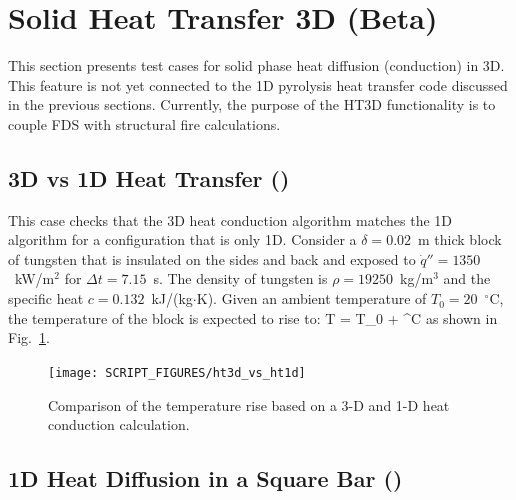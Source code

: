 \documentclass[11pt]{book}
\begin{document}
\newpage

\clearpage

\section{Solid Heat Transfer 3D (Beta)}
\label{sec:ht3d}

This section presents test cases for solid phase heat diffusion (conduction) in 3D.  This feature is not yet connected to the 1D pyrolysis heat transfer code discussed in the previous sections.  Currently, the purpose of the HT3D functionality is to couple FDS with structural fire calculations.

\subsection{3D vs 1D Heat Transfer (\texorpdfstring{}{ht3d\_vs\_ht1d})}
\label{ht3d_vs_ht1d}

This case checks that the 3D heat conduction algorithm matches the 1D algorithm for a configuration that is only 1D. Consider a $\delta=0.02$~m thick block of tungsten that is insulated on the sides and back and exposed to $\dot{q}''=1350$~kW/m$^2$ for $\Delta t=7.15$~s. The density of tungsten is $\rho=19250$~kg/m$^3$ and the specific heat $c=0.132$~kJ/(kg$\cdot$K). Given an ambient temperature of $T_0=20$~$^\circ$C, the temperature of the block is expected to rise to:
\be
   T = T_0 +   \; ^\circ \hbox{C}
\ee
as shown in Fig.~\ref{fig:ht3d_vs_ht1d}.

\begin{figure}[ht]
\centering
\texttt{[image: SCRIPT\_FIGURES/ht3d\_vs\_ht1d]}
\caption[The  test case]{Comparison of the temperature rise based on a 3-D and 1-D heat conduction calculation.}
\label{fig:ht3d_vs_ht1d}
\end{figure}

\FloatBarrier


\subsection{1D Heat Diffusion in a Square Bar (\texorpdfstring{}{ht3d\_nx\_x})}
\label{sec:heat_diff}
\label{ht3d_nx_10}
\label{ht3d_nx_20}
\label{ht3d_nx_40}
\label{ht3d_nx_80}
\label{ht3d_nx_160}
\label{ht3d_ny_10}
\label{ht3d_ny_20}
\label{ht3d_ny_40}
\label{ht3d_ny_80}
\label{ht3d_ny_160}
\label{ht3d_nz_10}
\label{ht3d_nz_20}
\label{ht3d_nz_40}
\label{ht3d_nz_80}
\label{ht3d_nz_160}
\end{document}
